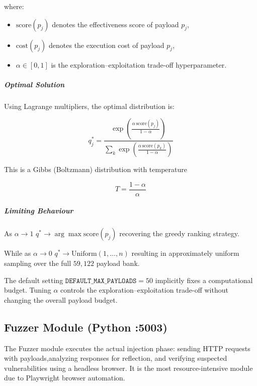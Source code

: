 where:

\begin{itemize}
    \item \(\mathrm{score}(p_j)\) denotes the effectiveness score of payload \(p_j\),
    \item \(\mathrm{cost}(p_j)\) denotes the execution cost of payload \(p_j\),
    \item \(\alpha \in [0,1]\) is the exploration--exploitation trade-off hyperparameter.
\end{itemize}

\subparagraph*{Optimal Solution}

Using Lagrange multipliers, the optimal distribution is:

\[
q_j^{*}
=
\frac{
\exp\!\left(
\frac{
\alpha \, \mathrm{score}(p_j)
}{
1-\alpha
}
\right)
}{
\sum_{k}
\exp\!\left(
\frac{
\alpha \, \mathrm{score}(p_k)
}{
1-\alpha
}
\right)
}
\]

This is a Gibbs (Boltzmann) distribution with temperature

\[
T = \frac{1-\alpha}{\alpha}
\]

\subparagraph*{Limiting Behaviour}

As $\alpha \to 1$\text{, } $ q^{*}\to\arg\max \mathrm{score}(p_j) $ recovering the greedy ranking strategy.

While as $\alpha \to 0$\text{, } $ q^{*} \to \text{Uniform}(1,\dots,n) $ resulting in approximately uniform sampling over the full \(59,122\) payload bank.

The default setting $ \texttt{DEFAULT\_MAX\_PAYLOADS} = 50$ implicitly fixes a computational budget. Tuning \(\alpha\) controls the exploration--exploitation trade-off without changing the overall payload budget.






\subsection{Fuzzer Module (Python :5003)}
The Fuzzer module executes the actual injection phase: sending HTTP requests with payloads,analyzing responses for reflection, and verifying suspected vulnerabilities using a headless browser. It is the most resource-intensive module due to Playwright browser automation.

